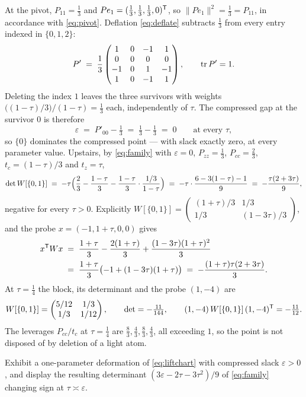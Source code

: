 \begin{example}
At the pivot, $P_{11}=\tfrac13$ and
$Pe_1=(\tfrac13,\tfrac13,\tfrac13,0)^{\mathsf{T}}$, so
$\lVert Pe_1\rVert^{2}=\tfrac13=P_{11}$, in accordance with
\eqref{eq:pivot}.  Deflation \eqref{eq:deflate} subtracts $\tfrac13$ from
every entry indexed in $\{0,1,2\}$:
\[
  P'\;=\;\frac13\begin{pmatrix}
    1&0&-1&1\\ 0&0&0&0\\ -1&0&1&-1\\ 1&0&-1&1\end{pmatrix},
  \qquad \operatorname{tr} P'=1 .
\]
Deleting the index $1$ leaves the three survivors with weights
$\bigl((1-\tau)/3\bigr)/(1-\tau)=\tfrac13$ each, independently of $\tau$.
The compressed gap at the survivor $0$ is therefore
\[
  \varepsilon\;=\;P'_{00}-\tfrac13\;=\;\tfrac13-\tfrac13\;=\;0
  \qquad\text{at every }\tau ,
\]
so $\{0\}$ dominates the compressed point --- with slack exactly zero, at
every parameter value.  Upstairs, by \eqref{eq:family} with $\varepsilon=0$,
$P_{zz}=\tfrac13$, $P_{cc}=\tfrac23$, $t_c=(1-\tau)/3$ and $t_z=\tau$,
\[
  \det W[\{0,1\}]
  \;=\;-\tau\Bigl(\frac23-\frac{1-\tau}{3}
      -\frac{1-\tau}{3}\cdot\frac{1/3}{1-\tau}\Bigr)
  \;=\;-\tau\cdot\frac{6-3(1-\tau)-1}{9}
  \;=\;-\frac{\tau(2+3\tau)}{9},
\]
negative for every $\tau>0$.  Explicitly
$W[\{0,1\}]=\left(\begin{smallmatrix}(1+\tau)/3&1/3\\
1/3&(1-3\tau)/3\end{smallmatrix}\right)$, and the probe
$x=(-1,1+\tau,0,0)$ gives
\begin{align*}
  x^{\mathsf{T}} Wx
  &\;=\;\frac{1+\tau}{3}-\frac{2(1+\tau)}{3}
      +\frac{(1-3\tau)(1+\tau)^{2}}{3}\\
  &\;=\;\frac{1+\tau}{3}\bigl(-1+(1-3\tau)(1+\tau)\bigr)
  \;=\;-\frac{(1+\tau)\tau(2+3\tau)}{3}.
\end{align*}
At $\tau=\tfrac14$ the block, its determinant and the probe $(1,-4)$ are
\[
  W[\{0,1\}]=\begin{pmatrix}5/12&1/3\\ 1/3&1/12\end{pmatrix},
  \qquad \det=-\tfrac{11}{144},
  \qquad (1,-4)\,W[\{0,1\}]\,(1,-4)^{\mathsf{T}}=-\tfrac{11}{12}.
\]
The leverages $P_{cc}/t_c$ at $\tau=\tfrac14$ are
$\tfrac83,\tfrac43,\tfrac83,\tfrac43$, all exceeding $1$, so the point is not
disposed of by deletion of a light atom.
\end{example}

\begin{wip}
Exhibit a one-parameter deformation of \eqref{eq:liftchart} with compressed
slack $\varepsilon>0$, and display the resulting determinant
$(3\varepsilon-2\tau-3\tau^{2})/9$ of \eqref{eq:family} changing sign at
$\tau\asymp \varepsilon$.
\end{wip}

